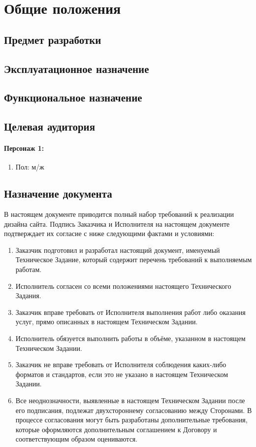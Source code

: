 \section{Общие положения}

\subsection{Предмет разработки}

\subsection{Эксплуатационное назначение}

\subsection{Функциональное назначение}

\subsection{Целевая аудитория}
\paragraph{Персонаж 1:}
\begin{enumerate}
  \item Пол: м/ж
\end{enumerate}

\subsection{Назначение документа}
В настоящем документе приводится полный набор требований к реализации дизайна сайта.
Подпись Заказчика и Исполнителя на настоящем документе подтверждает их согласие с ниже следующими фактами и условиями:
\begin{enumerate}
  \item Заказчик подготовил и разработал настоящий документ, именуемый Техническое Задание, который содержит перечень требований к выполняемым работам.
  \item Исполнитель согласен со всеми положениями настоящего Технического Задания.
  \item Заказчик вправе требовать от Исполнителя выполнения работ либо оказания услуг, прямо описанных в настоящем Техническом Задании.
  \item Исполнитель обязуется выполнить работы в объёме, указанном в настоящем Техническом Задании.
  \item Заказчик не вправе требовать от Исполнителя соблюдения каких-либо форматов и стандартов, если это не указано в настоящем Техническом Задании.
  \item Все неоднозначности, выявленные в настоящем Техническом Задании после его подписания, подлежат двухстороннему согласованию между Сторонами. В процессе согласования могут быть разработаны дополнительные требования, которые оформляются дополнительным соглашением к Договору и соответствующим образом оцениваются.
\end{enumerate}

